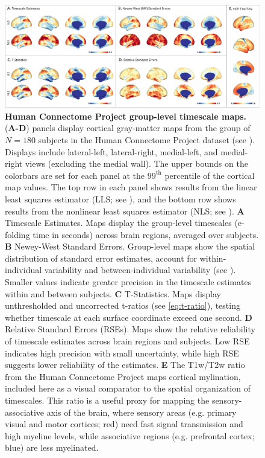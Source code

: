 \documentclass[latex/main.tex]{subfiles}
\begin{document}
\begin{figure}[H]
    \centering
    \includegraphics[width=1\textwidth]{latex/figures/fig05-hcp180.png} 
    \caption{
    \textbf{Human Connectome Project group-level timescale maps.}
    (\textbf{A-D}) panels display cortical gray-matter maps from the group of $N=180$ subjects in the Human Connectome Project dataset (see ). Displays include lateral-left, lateral-right, medial-left, and medial-right views (excluding the medial wall). The upper bounds on the colorbars are set for each panel at the $99^\text{th}$ percentile of the cortical map values. The top row in each panel shows results from the linear least squares estimator (LLS; see ), and the bottom row shows results from the nonlinear least squares estimator (NLS; see ). 
    \textbf{A} Timescale Estimates. Maps display the group-level timescales (e-folding time in seconds) across brain regions, averaged over subjects.
    \textbf{B} Newey-West Standard Errors. Group-level maps show the spatial distribution of standard error estimates, account for within-individual variability and between-individual variability (see ). Smaller values indicate greater precision in the timescale estimates within and between subjects.
    \textbf{C} T-Statistics. Maps display unthresholded and uncorrected t-ratios (see \eqref{eq:t-ratio}), testing whether timescale at each surface coordinate exceed one second.
    \textbf{D} Relative Standard Errors (RSEs). Maps show the relative reliability of timescale estimates across brain regions and subjects. Low RSE indicates high precision with small uncertainty, while high RSE suggests lower reliability of the estimates.
    \textbf{E} The T1w/T2w ratio from the Human Connectome Project maps cortical mylination, included here as a visual comparator to the spatial organization of timescales. This ratio is a useful proxy for mapping the sensory-associative axis of the brain, where sensory areas (e.g. primary visual and motor cortices; red) need fast signal transmission and high myeline levels, while associative regions (e.g. prefrontal cortex; blue) are less myelinated.
    }
    \label{fig:map-hcp180}
\end{figure}
\end{document}
